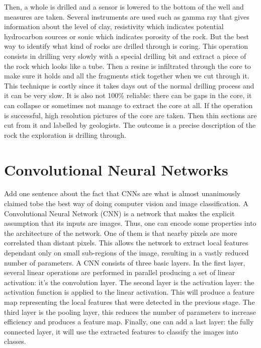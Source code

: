 Then, a whole is drilled and a sensor is lowered to the bottom of the well and measures are taken. Several instruments are used such as gamma ray that gives information about the level of clay, resistivity which indicates potential hydrocarbon sources or sonic which indicates porosity of the rock. But the best way to identify what kind of rocks are drilled through is coring. This operation consists in drilling very slowly with a special drilling bit and extract a piece of the rock which looks like a tube. Then a resine is infiltrated through the core to make sure it holds and all the fragments stick together when we cut through it. 
This technique is costly since it takes days out of the normal drilling process and it can be very slow. It is also not 100\% reliable: there can be gaps in the core, it can collapse or sometimes not manage to extract the core at all. 
If the operation is successful, high resolution pictures of the core are taken. Then thin sections are cut from it and labelled by geologists. The outcome is a precise description of the rock the exploration is drilling through.  

\section{Convolutional Neural Networks}
Add one sentence about the fact that CNNs are what is almost unanimously claimed tobe the best way of doing computer vision and image classification.
A Convolutional Neural Network (CNN) is a network that makes the explicit assumption that its inputs are images. Thus, one can encode some properties into the architecture of the network. One of them is that nearby pixels are more correlated than distant pixels. This allows the network to extract local features dependant only on small sub-regions of the image, resulting in a vastly reduced number of parameters. 
A CNN consists of three basic layers.  In the first layer, several linear operations are performed in parallel producing a set of linear activation: it's the convolution layer. The second layer is the activation layer: the activation function is applied to the linear activation. This will produce a feature map representing the local features that were detected in the previous stage. The third layer is the pooling layer, this reduces the number of parameters to increase efficiency and produces a feature map. Finally, one can add a last layer: the fully connected layer, it will use the extracted features to classify the images into classes. 

